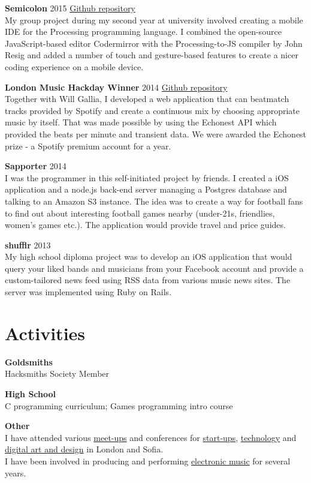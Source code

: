 \documentclass[margin,line,a4paper]{resume}
\begin{document}
\begin{resume}
\textbf{Semicolon} 2015 \hfill
\href{https://github.com/nicknikolov/semicolon}{Github repository} \\
My group project during my second year at university involved creating a mobile IDE for the Processing programming language. I combined the open-source JavaScript-based editor Codermirror with the Processing-to-JS compiler by John Resig and added a number of touch and gesture-based features to create a nicer coding experience on a mobile device.

\textbf{London Music Hackday Winner} 2014 \hfill
\href{https://github.com/whg/spotijay}{Github repository} \\
Together with Will Gallia, I developed a web application that can beatmatch tracks provided by Spotify and create a continuous mix by choosing appropriate music by itself. That was made possible by using the Echonest API which provided the beats per minute and transient data. We were awarded the Echonest prize - a Spotify premium account for a year.

\textbf{Sapporter} 2014 \\
I was the programmer in this self-initiated project by friends. I created a iOS application and a node.js back-end server managing a Postgres database and talking to an Amazon S3 instance. The idea was to create a way for football fans to find out about interesting football games nearby (under-21s, friendlies, women's games etc.).
The application would provide travel and price guides.

\textbf{shufflr} 2013 \\
My high school diploma project was to develop an iOS application that would query your liked bands and musicians from your Facebook account and provide a custom-tailored news feed using RSS data from various music news sites.
The server was implemented using Ruby on Rails. \\

\section{\mysidestyle Activities}

\textbf{Goldsmiths} \\
Hacksmiths Society Member

\textbf{High School} \\
C programming curriculum; Games programming intro course

\textbf{Other} \\
I have attended various \href{http://www.meetup.com/HNLondon/}{meet-ups} and conferences for \href{http://www.startupschool.org/}{start-ups}, \href{https://en.wikipedia.org/wiki/Digitalk}{technology} and \href{http://www.alpha-ville.co.uk/exchange/}{digital art and design} in London and Sofia. \\
I have been involved in producing and performing \href{https://soundcloud.com/nick-nikolov}{electronic music} for several years.

\end{resume}
\end{document}
